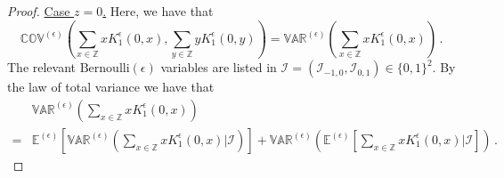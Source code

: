 \documentclass[10pt,a4paper]{amsart}
\begin{document}
\begin{proof}
\item{\underline{Case $z=0$.}} Here, we have that 
\begin{equation*}
	\mathbb{COV}^{(\epsilon)}\left(\sum_{x\in \mathbb{Z}}x K_{1}^{\epsilon}(0,x),\sum_{y\in \mathbb{Z}}yK_{1}^{\epsilon}(0,y)\right)=\mathbb{VAR}^{(\epsilon)}\left(\sum_{x\in \mathbb{Z}}xK_{1}^{\epsilon}(0,x)\right)\,.
\end{equation*}
The relevant $\text{Bernoulli}(\epsilon)$ variables are listed in  $\bm{\mathcal{I}}=(\mathcal{I}_{-1,0},\mathcal{I}_{0,1})\in \{0,1\}^{2}$. 
By the law of total variance we have that
\begin{equation*}
	\begin{split}
		&\mathbb{VAR}^{(\epsilon)}\left(\sum_{x\in \mathbb{Z}}xK_{1}^{\epsilon}(0,x)\right)
		\\=&\mathbb{E}^{(\epsilon)}\left[\mathbb{VAR}^{(\epsilon)}\left(\sum_{x\in \mathbb{Z}}xK_{1}^{\epsilon}(0,x)\bigg|\bm{\mathcal{I}}\right)\right]+\mathbb{VAR}^{(\epsilon)}\left(\mathbb{E}^{(\epsilon)}\left[\sum_{x\in \mathbb{Z}}xK_{1}^{\epsilon}(0,x)\bigg|\bm{\mathcal{I}}\right]\right)\,.
	\end{split}
\end{equation*}


\end{proof}
\end{document}
